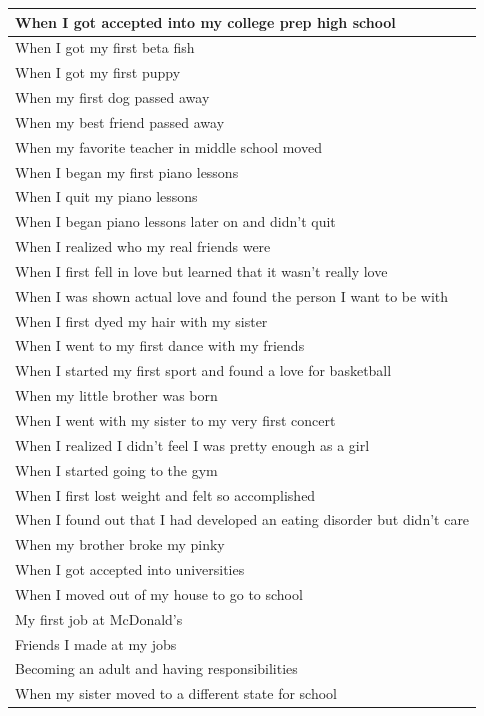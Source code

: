 \documentclass[
  .7em,
  letterpaper,
  DIV=11,
  numbers=noendperiod]{scrartcl}
\begin{document}
\begin{table}
\begin{tabular}{l}
\hline
When I got accepted into my college prep high school\\
\hline
When I got my first beta fish\\
\hline
When I got my first puppy\\
\hline
When my first dog passed away\\
\hline
When my best friend passed away\\
\hline
When my favorite teacher in middle school moved\\
\hline
When I began my first piano lessons\\
\hline
When I quit my piano lessons\\
\hline
When I began piano lessons later on and didn’t quit\\
\hline
When I realized who my real friends were\\
\hline
When I first fell in love but learned that it wasn’t really love\\
\hline
When I was shown actual love and found the person I want to be with\\
\hline
When I first dyed my hair with my sister\\
\hline
When I went to my first dance with my friends\\
\hline
When I started my first sport and found a love for basketball\\
\hline
When my little brother was born\\
\hline
When I went with my sister to my very first concert\\
\hline
When I realized I didn’t feel I was pretty enough as a girl\\
\hline
When I started going to the gym\\
\hline
When I first lost weight and felt so accomplished\\
\hline
When I found out that I had developed an eating disorder but didn’t care\\
\hline
When my brother broke my pinky\\
\hline
When I got accepted into universities\\
\hline
When I moved out of my house to go to school\\
\hline
My first job at McDonald’s\\
\hline
Friends I made at my jobs\\
\hline
Becoming an adult and having responsibilities\\
\hline
When my sister moved to a different state for school\\
\hline

\end{tabular}
\end{table}
\end{document}
